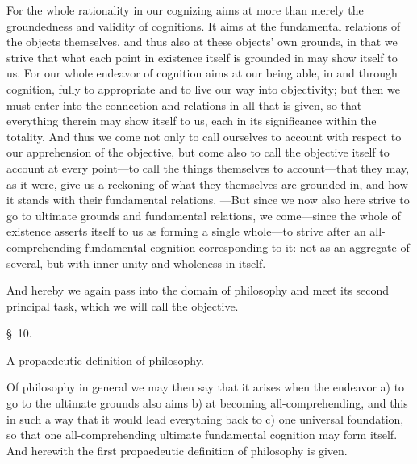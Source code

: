 \documentclass[12pt,a4paper]{book}
\begin{document}
For the whole rationality in our cognizing aims at more than merely the
groundedness and validity of cognitions. It aims at the fundamental relations of
the objects themselves, and thus also at these objects' own grounds, in that we
strive that what each point in existence itself is grounded in may show itself to
us. For our whole endeavor of cognition aims at our being able, in and through
cognition, fully to appropriate and to live our way into objectivity; but then we
must enter into the connection and relations in all that is given, so that
everything therein may show itself to us, each in its significance within the
totality. And thus we come not only to call ourselves to account with respect to
our apprehension of the objective, but come also to call the objective itself to
account at every point---to call the things themselves to account---that they may,
as it were, give us a reckoning of what they themselves are grounded in, and how
it stands with their fundamental relations. ---But since we now also here strive to
go to ultimate grounds and fundamental relations, we come---since the whole of
existence asserts itself to us as forming a single whole---to strive after an
all-comprehending fundamental cognition corresponding to it: not as an aggregate
of several, but with inner unity and wholeness in itself.

And hereby we again pass into the domain of philosophy and meet its second
principal task, which we will call the objective.

\begin{center}\large\S~10.\end{center}
\begin{center}A propaedeutic definition of philosophy.\end{center}

Of philosophy in general we may then say that it arises when the endeavor a) to go
to the ultimate grounds also aims b) at becoming all-comprehending, and this in
such a way that it would lead everything back to c) one universal foundation, so
that one all-comprehending ultimate fundamental cognition may form itself. And
herewith the first propaedeutic definition of philosophy is given.
\end{document}
